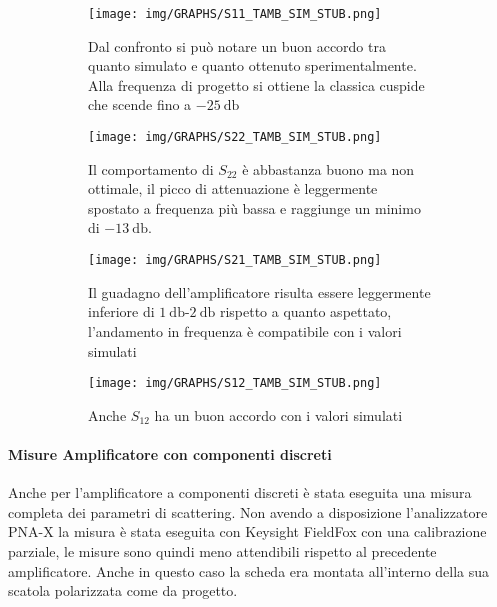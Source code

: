 \documentclass[12pt,oneside]{book}
\begin{document}
\begin{figure}[!htbp]
    \centering
    \begin{subfigure}[t]{0.48\textwidth}
        \centering
        \texttt{[image: img/GRAPHS/S11\_TAMB\_SIM\_STUB.png]}
        \caption{Dal confronto si può notare un buon accordo tra quanto simulato e quanto ottenuto sperimentalmente. Alla frequenza di progetto si ottiene la classica cuspide che scende fino a $\SI{-25}{\decibel}$}
    \end{subfigure}
    \hfill
    \begin{subfigure}[t]{0.48\textwidth}
        \centering
        \texttt{[image: img/GRAPHS/S22\_TAMB\_SIM\_STUB.png]}
        \caption{Il comportamento di $S_{22}$ è abbastanza buono ma non ottimale, il picco di attenuazione è leggermente spostato a frequenza più bassa e raggiunge un minimo di $\SI{-13}{\decibel}$.}
    \end{subfigure}
    \hfill
    \centering
    \begin{subfigure}[t]{0.48\textwidth}
        \centering
        \texttt{[image: img/GRAPHS/S21\_TAMB\_SIM\_STUB.png]}
        \caption{Il guadagno dell'amplificatore risulta essere leggermente inferiore di $\SI{1}{\decibel}$-$\SI{2}{\decibel}$ rispetto a quanto aspettato, l'andamento in frequenza è compatibile con i valori simulati}
    \end{subfigure}
    \hfill
    \begin{subfigure}[t]{0.48\textwidth}
        \centering
        \texttt{[image: img/GRAPHS/S12\_TAMB\_SIM\_STUB.png]}
        \caption{Anche $S_{12}$ ha un buon accordo con i valori simulati}
    \end{subfigure}
    \caption{}
    \label{amb_stub}
\end{figure}

\paragraph{Misure Amplificatore con componenti discreti}

Anche per l'amplificatore a componenti discreti è stata eseguita una misura completa dei parametri di scattering. Non avendo a disposizione l'analizzatore PNA-X la misura è stata eseguita con Keysight FieldFox con una calibrazione parziale, le misure sono quindi meno attendibili rispetto al precedente amplificatore. Anche in questo caso la scheda era montata all'interno della sua scatola polarizzata come da progetto.
\end{document}
